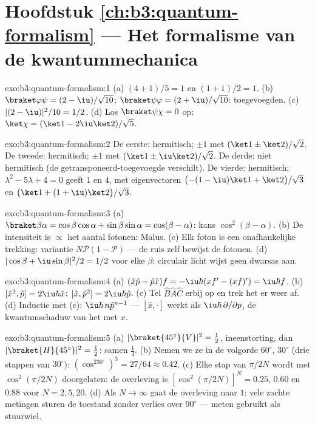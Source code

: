 \section*{Hoofdstuk \ref{ch:b3:quantum-formalism} --- Het formalisme van de kwantummechanica}

\begin{solution}{exo:b3:quantum-formalism:1}
(a) $(4 + 1)/5 = 1$ en $(1 + 1)/2 = 1$. (b) $\braket\varphi\psi =
(2 - \iu)/\sqrt{10}$; $\braket\psi\varphi = (2 + \iu)/\sqrt{10}$:
toegevoegden. (c) $|(2 - \iu)|^2/10 = 1/2$. (d) Los
$\braket\psi\chi = 0$ op: $\ket\chi = (\ket1 - 2\iu\ket2)/\sqrt5$.
\end{solution}

\begin{solution}{exo:b3:quantum-formalism:2}
De eerste: hermitisch; $\pm1$ met $(\ket1 \pm \ket2)/\sqrt2$. De tweede:
hermitisch; $\pm1$ met $(\ket1 \pm \iu\ket2)/\sqrt2$. De derde: niet
hermitisch (de getransponeerd-toegevoegde verschilt). De vierde:
hermitisch; $\lambda^2 - 5\lambda + 4 = 0$ geeft $1$ en $4$, met
eigenvectoren $\big({-(1 - \iu)}\ket1 + \ket2\big)/\sqrt3$ en $\big(\ket1 +
(1 + \iu)\ket2\big)/\sqrt3$.
\end{solution}

\begin{solution}{exo:b3:quantum-formalism:3}
(a) $\braket\beta\alpha = \cos\beta\cos\alpha + \sin\beta\sin\alpha
= \cos(\beta - \alpha)$: kans $\cos^2(\beta - \alpha)$. (b) De
intensiteit is $\propto$ het aantal fotonen: Malus. (c) Elk foton is een
onafhankelijke trekking: variantie $N\mathcal P(1 - \mathcal P)$ --- de
ruis zelf bewijst de fotonen. (d) $|\cos\beta + \iu\sin\beta|^2/2
= 1/2$ voor elke $\beta$: circulair licht wijst geen dwarsas aan.
\end{solution}

\begin{solution}{exo:b3:quantum-formalism:4}
(a) $(\hat x\hat p - \hat p\hat x)f = -\iu\hbar(xf' - (xf)') =
\iu\hbar f$. (b) $[\hat x^2, \hat p] = 2\iu\hbar\hat x$; $[\hat x,
\hat p^2] = 2\iu\hbar\hat p$. (c) Tel $\hat B\hat A
\hat C$ erbij op en
trek het er weer af. (d) Inductie met (c): $\iu\hbar\,n\hat p^{n-1}$ ---
$[\hat x, \cdot]$ werkt als $\iu\hbar\,\partial/\partial p$, de
kwantumschaduw van het  met $x$.
\end{solution}

\begin{solution}{exo:b3:quantum-formalism:5}
(a) $|\braket{45^\circ}{V}|^2 = \tfrac12$, ineenstorting, dan
$|\braket{H}{45^\circ}|^2 = \tfrac12$: samen $\tfrac14$. (b) Nemen we ze
in de volgorde $60^\circ$, $30^\circ$ (drie stappen van $30^\circ$):
$(\cos^230^\circ)^3 = 27/64 \approx 0.42$. (c) Elke stap van $\pi/2N$
wordt met $\cos^2(\pi/2N)$ doorgelaten: de overleving is
$[\cos^2(\pi/2N)]^N
= 0.25$, $0.60$ en $0.88$ voor $N = 2, 5, 20$. (d)
Als $N \to \infty$ gaat de overleving naar $1$: vele zachte metingen
sturen de toestand zonder verlies over $90^\circ$ --- meten gebruikt als
stuurwiel.
\end{solution}

